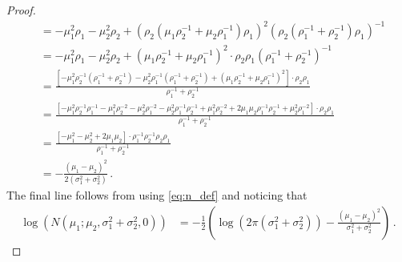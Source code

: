 \documentclass[a4paper]{article}
\begin{document}
\begin{proof}
\begin{align*}
                                                                                                            & = -\mu_1^2\rho_1 -\mu_2^2\rho_2 + \left(\rho_2\left(\mu_1\rho_2^{-1}+\mu_2\rho_1^{-1}\right)\rho_1\right)^2\left(\rho_2\left(\rho_1^{-1}+\rho_2^{-1}\right)\rho_1\right)^{-1}                                                        \\
                                                                                                            & = -\mu_1^2\rho_1 -\mu_2^2\rho_2 + \left(\mu_1\rho_2^{-1}+\mu_2\rho_1^{-1}\right)^2 \cdot \rho_2\rho_1\left(\rho_1^{-1}+\rho_2^{-1}\right)^{-1}                                                                                       \\
                                                                                                            & = \frac{\left[-\mu_1^2\rho_2^{-1}\left(\rho_1^{-1}+\rho_2^{-1}\right) -\mu_2^2\rho_1^{-1}\left(\rho_1^{-1}+\rho_2^{-1}\right) + \left(\mu_1\rho_2^{-1}+\mu_2\rho_1^{-1}\right)^2\right] \cdot \rho_2\rho_1}{\rho_1^{-1}+\rho_2^{-1}} \\
                                                                                                            & = \frac{\left[-\mu_1^2\rho_2^{-1}\rho_1^{-1}-\mu_1^2\rho_2^{-2} - \mu_2^2\rho_1^{-2} - \mu_2^2\rho_1^{-1}\rho_2^{-1} +
        \mu_1^2\rho_2^{-2} + 2\mu_1\mu_2\rho_1^{-1}\rho_2^{-1} + \mu_2^2\rho_1^{-2}\right] \cdot \rho_2\rho_1}{\rho_1^{-1}+\rho_2^{-1}}                                                                                                                                                                                                            \\
                                                                                                            & = \frac{\left[-\mu_1^2 - \mu_2^2 + 2\mu_1\mu_2\right] \cdot \rho_1^{-1}\rho_2^{-1}\rho_2\rho_1}{\rho_1^{-1}+\rho_2^{-1}}                                                                                                             \\
                                                                                                            & = -\frac{\left(\mu_1 - \mu_2 \right)^2}{2\left(\sigma_1^2 + \sigma_2^2\right)} \,.
    \end{align*}
    The final line follows from using \eqref{eq:n_def} and noticing that
    \begin{align*}
        \log\left(N\left(\mu_1;\mu_2,\sigma_1^2+\sigma_2^2,0\right)\right) & = - \frac{1}{2}\left(\log\left(2\pi \left(\sigma_1^2+\sigma_2^2\right)\right) - \frac{\left(\mu_1 - \mu_2\right)^2}{\sigma_1^2+\sigma_2^2}\right)\,.
    \end{align*}
\end{proof}
\end{document}
